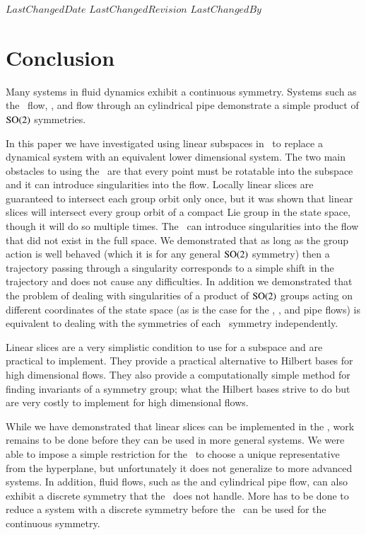 
{$LastChangedDate$}
{$LastChangedRevision$} {$LastChangedBy$}


\section{Conclusion}

Many systems in fluid dynamics exhibit a continuous symmetry. Systems
such as the \KS\ flow,
{\pCf}, and flow through an
cylindrical pipe demonstrate a simple product of
$\textrm{SO}(2)$ symmetries.

In this paper we have investigated using linear subspaces in
\mslices\ to replace a dynamical system with an equivalent
lower dimensional system. The two main obstacles to using the \mslices\
are that every point must be rotatable into the subspace and it can
introduce singularities into the flow. Locally linear slices are
guaranteed to intersect each group orbit only once, but it was shown that
linear slices will intersect every group orbit of a compact Lie group in
the state space, though it will do so multiple times. The \mslices\ can
introduce singularities into the flow that did not exist in the full
space. We demonstrated that as long as the group action is well behaved
(which it is for any general $\textrm{SO}(2)$ symmetry) then a trajectory
passing through a singularity corresponds to a simple shift in the
trajectory and does not cause any difficulties. In addition we
demonstrated that the problem of dealing with singularities of a product
of $\textrm{SO}(2)$ groups acting on different coordinates of the state space
(as is the case for the \KS\rf{ku,siv},
{\pCf}, and
pipe flows) is equivalent to dealing with the
symmetries of each \SOn{2}\ symmetry independently.

Linear slices are a very simplistic condition to use for a subspace and
are practical to implement. They provide a practical alternative to
Hilbert bases for high dimensional flows. They also provide a
computationally simple method for finding invariants of a symmetry group;
what the Hilbert bases strive to do but are very costly to implement for
high dimensional flows.

While we have demonstrated that linear slices can be implemented in the
\mslices, work remains to be done before they can be used in more general
systems. We were able to impose a simple restriction for the
\cLe\ to choose a unique representative from the
hyperplane, but unfortunately it does not generalize to more advanced
systems. In addition, fluid flows, such as the {\pCf} and cylindrical
pipe flow, can also exhibit a discrete symmetry that the \mslices\ does
not handle. More has to be done to reduce a system with a discrete
symmetry before the \mslices\ can be used for the continuous symmetry.

